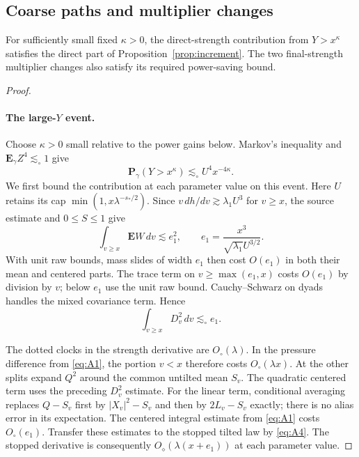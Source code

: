 \subsection{Coarse paths and multiplier changes}
\begin{lemma}\label{lem:statistics-coarse-switch}
For sufficiently small fixed $\kappa>0$, the direct-strength contribution
from $Y>x^\kappa$ satisfies the direct part of
Proposition~\ref{prop:increment}.  The two final-strength multiplier
changes also satisfy its required power-saving bound.
\end{lemma}
\begin{proof}
\leavevmode\par
\paragraph{The large-$Y$ event.}

Choose $\kappa>0$ small relative to the power gains below.
Markov's inequality and $\mathbf E_\gamma Z^4\lesssim_\circ1$ give
\[
 \mathbf P_\gamma(Y>x^\kappa)\lesssim_\circ U^4x^{-4\kappa}.
\]
We first bound the contribution at each parameter value on this event.
Here $U$ retains its cap $\min(1,x\lambda^{-s_*/2})$.  Since
$v\,dh/dv\gtrsim\lambda_1U^3$ for $v\ge x$, the source estimate
and $0\le S\le1$ give
\begin{equation*}
 \int_{v\ge x}\mathbf EW\,dv\lesssim e_1^2,
 \qquad e_1=\frac{x^3}{\sqrt{\lambda_1}U^{3/2}}.
\end{equation*}
With unit raw bounds, mass slides of width $e_1$ then cost
$O(e_1)$ in both their mean and centered parts.  The trace term on
$v\ge\max(e_1,x)$ costs $O(e_1)$ by division by $v$; below $e_1$
use the unit raw bound.  Cauchy--Schwarz on dyads handles the mixed
covariance term.  Hence
\[
 \int_{v\ge x}D_v^2\,dv\lesssim_\circ e_1.
\]

The dotted clocks in the strength derivative are $O_\circ(\lambda)$.
In the pressure difference from \eqref{eq:A1}, the portion $v<x$
therefore costs $O_\circ(\lambda x)$.  At the other splits expand
$Q^2$ around the common untilted mean $S_v$.  The quadratic centered
term uses the preceding $D_v^2$ estimate.  For the linear term,
conditional averaging replaces $Q-S_v$ first by $|X_v|^2-S_v$ and
then by $2L_v-S_v$ exactly; there is no alias error in its expectation.
The centered integral estimate from \eqref{eq:A1} costs $O_\circ(e_1)$.
Transfer these estimates to the stopped tilted law by \eqref{eq:A4}.
The stopped derivative is consequently
$O_\diamond(\lambda(x+e_1))$ at each parameter value.


\end{proof}
